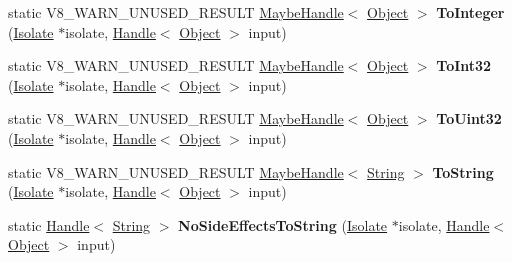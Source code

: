 \begin{DoxyCompactItemize}
static V8\+\_\+\+W\+A\+R\+N\+\_\+\+U\+N\+U\+S\+E\+D\+\_\+\+R\+E\+S\+U\+LT \mbox{\hyperlink{classv8_1_1internal_1_1MaybeHandle}{Maybe\+Handle}}$<$ \mbox{\hyperlink{classv8_1_1internal_1_1Object}{Object}} $>$ {\bfseries To\+Integer} (\mbox{\hyperlink{classv8_1_1internal_1_1Isolate}{Isolate}} $\ast$isolate, \mbox{\hyperlink{classv8_1_1internal_1_1Handle}{Handle}}$<$ \mbox{\hyperlink{classv8_1_1internal_1_1Object}{Object}} $>$ input)
\item 
\mbox{\label{classv8_1_1internal_1_1Object_ab5d0c0570ca4799300e7000d13565209}} 
static V8\+\_\+\+W\+A\+R\+N\+\_\+\+U\+N\+U\+S\+E\+D\+\_\+\+R\+E\+S\+U\+LT \mbox{\hyperlink{classv8_1_1internal_1_1MaybeHandle}{Maybe\+Handle}}$<$ \mbox{\hyperlink{classv8_1_1internal_1_1Object}{Object}} $>$ {\bfseries To\+Int32} (\mbox{\hyperlink{classv8_1_1internal_1_1Isolate}{Isolate}} $\ast$isolate, \mbox{\hyperlink{classv8_1_1internal_1_1Handle}{Handle}}$<$ \mbox{\hyperlink{classv8_1_1internal_1_1Object}{Object}} $>$ input)
\item 
\mbox{\label{classv8_1_1internal_1_1Object_acdd0c72fc73c44c65889d45847600e87}} 
static V8\+\_\+\+W\+A\+R\+N\+\_\+\+U\+N\+U\+S\+E\+D\+\_\+\+R\+E\+S\+U\+LT \mbox{\hyperlink{classv8_1_1internal_1_1MaybeHandle}{Maybe\+Handle}}$<$ \mbox{\hyperlink{classv8_1_1internal_1_1Object}{Object}} $>$ {\bfseries To\+Uint32} (\mbox{\hyperlink{classv8_1_1internal_1_1Isolate}{Isolate}} $\ast$isolate, \mbox{\hyperlink{classv8_1_1internal_1_1Handle}{Handle}}$<$ \mbox{\hyperlink{classv8_1_1internal_1_1Object}{Object}} $>$ input)
\item 
\mbox{\label{classv8_1_1internal_1_1Object_ac3fd30862533d93e482df31b341197b8}} 
static V8\+\_\+\+W\+A\+R\+N\+\_\+\+U\+N\+U\+S\+E\+D\+\_\+\+R\+E\+S\+U\+LT \mbox{\hyperlink{classv8_1_1internal_1_1MaybeHandle}{Maybe\+Handle}}$<$ \mbox{\hyperlink{classv8_1_1internal_1_1String}{String}} $>$ {\bfseries To\+String} (\mbox{\hyperlink{classv8_1_1internal_1_1Isolate}{Isolate}} $\ast$isolate, \mbox{\hyperlink{classv8_1_1internal_1_1Handle}{Handle}}$<$ \mbox{\hyperlink{classv8_1_1internal_1_1Object}{Object}} $>$ input)
\item 
\mbox{\label{classv8_1_1internal_1_1Object_adc253cda07d60776fc22010f5b26843e}} 
static \mbox{\hyperlink{classv8_1_1internal_1_1Handle}{Handle}}$<$ \mbox{\hyperlink{classv8_1_1internal_1_1String}{String}} $>$ {\bfseries No\+Side\+Effects\+To\+String} (\mbox{\hyperlink{classv8_1_1internal_1_1Isolate}{Isolate}} $\ast$isolate, \mbox{\hyperlink{classv8_1_1internal_1_1Handle}{Handle}}$<$ \mbox{\hyperlink{classv8_1_1internal_1_1Object}{Object}} $>$ input)

\end{DoxyCompactItemize}
